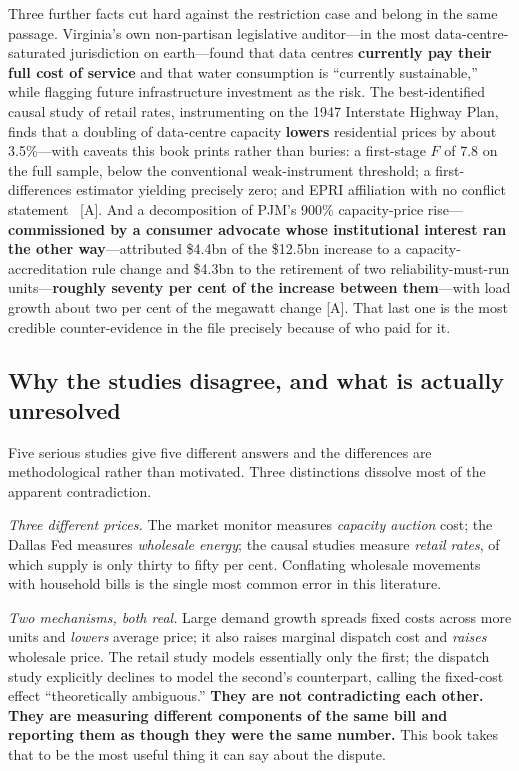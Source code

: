 Three further facts cut hard against the restriction case and belong in the same passage. Virginia's own non-partisan legislative auditor---in the most data-centre-saturated jurisdiction on earth---found that data centres \textbf{currently pay their full cost of service} and that water consumption is ``currently sustainable,'' while flagging future infrastructure investment as the risk. The best-identified causal study of retail rates, instrumenting on the 1947 Interstate Highway Plan, finds that a doubling of data-centre capacity \textbf{lowers} residential prices by about 3.5\%---with caveats this book prints rather than buries: a first-stage $F$ of 7.8 on the full sample, below the conventional weak-instrument threshold; a first-differences estimator yielding precisely zero; and EPRI affiliation with no conflict statement~\cite{moratorium-attribution} [A]. And a decomposition of PJM's 900\% capacity-price rise---\textbf{commissioned by a consumer advocate whose institutional interest ran the other way}---attributed \$4.4bn of the \$12.5bn increase to a capacity-accreditation rule change and \$4.3bn to the retirement of two reliability-must-run units---\textbf{roughly seventy per cent of the increase between them}---with load growth about two per cent of the megawatt change [A]. That last one is the most credible counter-evidence in the file precisely because of who paid for it.

\subsection{Why the studies disagree, and what is actually unresolved}

Five serious studies give five different answers and the differences are methodological rather than motivated. Three distinctions dissolve most of the apparent contradiction.

\emph{Three different prices.} The market monitor measures \emph{capacity auction} cost; the Dallas Fed measures \emph{wholesale energy}; the causal studies measure \emph{retail rates}, of which supply is only thirty to fifty per cent. Conflating wholesale movements with household bills is the single most common error in this literature.

\emph{Two mechanisms, both real.} Large demand growth spreads fixed costs across more units and \emph{lowers} average price; it also raises marginal dispatch cost and \emph{raises} wholesale price. The retail study models essentially only the first; the dispatch study explicitly declines to model the second's counterpart, calling the fixed-cost effect ``theoretically ambiguous.'' \textbf{They are not contradicting each other. They are measuring different components of the same bill and reporting them as though they were the same number.} This book takes that to be the most useful thing it can say about the dispute.

